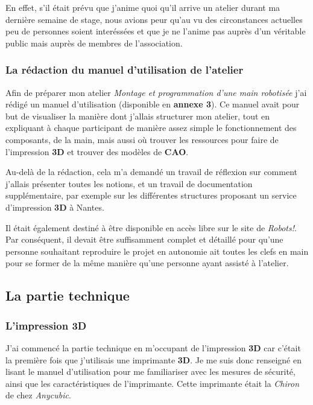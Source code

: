 \vspace{0.5cm}
En effet, s'il était prévu que j'anime quoi qu'il arrive un atelier durant ma dernière semaine de stage, nous avions peur qu'au vu des circonstances actuelles peu de personnes soient interéssées et que je ne l'anime pas auprès d'un véritable public mais auprès de membres de l'association.

\subsubsection{La rédaction du manuel d'utilisation de l'atelier}

Afin de préparer mon atelier \textit{Montage et programmation d'une main robotisée} j'ai rédigé un manuel d'utilisation (disponible en \textbf{annexe 3}). Ce manuel avait pour but de visualiser la manière dont j'allais structurer mon atelier, tout en expliquant à chaque participant de manière assez simple le fonctionnement des composants, de la main, mais aussi où trouver les ressources pour faire de l'impression \textbf{3D} et trouver des modèles de \textbf{CAO}. 

\vspace{0.5cm}
Au-delà de la rédaction, cela m'a demandé un travail de réflexion sur comment j'allais présenter toutes les notions, et un travail de documentation supplémentaire, par exemple sur les différentes structures proposant un service d'impression \textbf{3D} à Nantes.

\vspace{0.5cm}
Il était également destiné à être disponible en accès libre sur le site de \textit{Robots!}. Par conséquent, il devait être suffisamment complet et détaillé pour qu'une personne souhaitant reproduire le projet en autonomie ait toutes les clefs en main pour se former de la même manière qu'une personne ayant assisté à l'atelier.

\newpage

\subsection{La partie technique}
\subsubsection{L'impression 3D}

J'ai commencé la partie technique en m'occupant de l'impression \textbf{3D} car c'était la première fois que j'utilisais une imprimante \textbf{3D}. Je me suis donc renseigné en lisant le manuel d'utilisation \cite{anycubic_usuer_nodate} pour me familiariser avec les mesures de sécurité, ainsi que les caractéristiques de l'imprimante. Cette imprimante était la \textit{Chiron} de chez \textit{Anycubic}.

